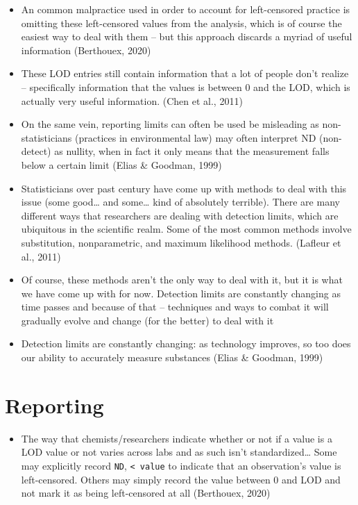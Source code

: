 \documentclass[12pt, twoside]{amherstthesis}
\providecommand{\tightlist}{%
  \setlength{\itemsep}{0pt}\setlength{\parskip}{0pt}}
\begin{document}
\begin{itemize}
\item
  An common malpractice used in order to account for left-censored practice is omitting these left-censored values from the analysis, which is of course the easiest way to deal with them -- but this approach discards a myriad of useful information (Berthouex, 2020)
\item
  These LOD entries still contain information that a lot of people don't realize -- specifically information that the values is between 0 and the LOD, which is actually very useful information. (Chen et al., 2011)
\item
  On the same vein, reporting limits can often be used be misleading as non-statisticians (practices in environmental law) may often interpret ND (non-detect) as nullity, when in fact it only means that the measurement falls below a certain limit (Elias \& Goodman, 1999)
\item
  Statisticians over past century have come up with methods to deal with this issue (some good\ldots{} and some\ldots{} kind of absolutely terrible). There are many different ways that researchers are dealing with detection limits, which are ubiquitous in the scientific realm. Some of the most common methods involve substitution, nonparametric, and maximum likelihood methods. (Lafleur et al., 2011)
\item
  Of course, these methods aren't the only way to deal with it, but it is what we have come up with for now. Detection limits are constantly changing as time passes and because of that -- techniques and ways to combat it will gradually evolve and change (for the better) to deal with it
\item
  Detection limits are constantly changing: as technology improves, so too does our ability to accurately measure substances (Elias \& Goodman, 1999)
\end{itemize}
\hypertarget{reporting}{%
\section{Reporting}\label{reporting}}
\begin{itemize}
\tightlist
\item
  The way that chemists/researchers indicate whether or not if a value is a LOD value or not varies across labs and as such isn't standardized\ldots{} Some may explicitly record \texttt{ND}, \texttt{\textless{}\ value} to indicate that an observation's value is left-censored. Others may simply record the value between 0 and LOD and not mark it as being left-censored at all (Berthouex, 2020)
\end{itemize}
\end{document}
